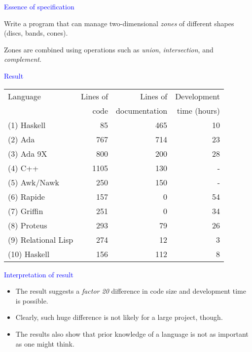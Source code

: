 \documentclass{slides}
\newcommand{\ti}[1]{\begin{center}\Large{\textcolor{blue}{#1}}\end{center}}
\begin{document}
\begin{slide}\ti{Essence of specification}

Write a program that can manage two-dimensional \emph{zones} of
different shapes (discs, bands, cones).

Zones are combined using operations such as \emph{union},
\emph{intersection}, and \emph{complement}.

\vfill\end{slide}
\begin{slide}\ti{Result}

  \begin{tabular}{|l|r|r|r|}
    \hline
    Language & Lines of & Lines of       & Development\\
             & code     & documentation  & time (hours)\\
    \hline
    \hline
    (1) Haskell     &   85 & 465 & 10\\
    \hline
    (2) Ada         &  767 & 714 & 23\\
    \hline
    (3) Ada 9X      &  800 & 200 & 28\\
    \hline
    (4) C++         & 1105 & 130 & -\\
    \hline
    (5) Awk/Nawk    &  250 & 150 & -\\
    \hline
    (6) Rapide      &  157 &   0 & 54\\
    \hline
    (7) Griffin     &  251 &   0 & 34\\
    \hline
    (8) Proteus     &  293 &  79 & 26\\
    \hline
    (9) Relational Lisp & 274 & 12 & 3\\
    \hline
    (10) Haskell    &  156 & 112 &  8\\
    \hline
  \end{tabular}

\vfill\end{slide}
\begin{slide}\ti{Interpretation of result}

  \begin{itemize}
  \item The result suggests a \emph{factor 20} difference in code size
    and development time is possible.
  \item Clearly, such huge difference is not likely for a large
    project, though.
  \item The results also show that prior knowledge of a language is
    not as important as one might think.
  \end{itemize}

\vfill\end{slide}
\end{document}
